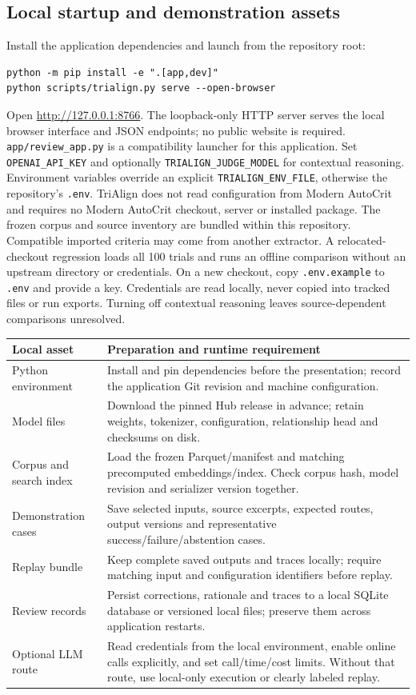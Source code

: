 \documentclass[10pt,letterpaper]{article}
\newcommand{\pathcode}[1]{\nolinkurl{#1}}
\begin{document}
\subsection{Local startup and demonstration assets}
\label{sec:localdemo}
Install the application dependencies and launch from the repository root:
\begin{verbatim}
python -m pip install -e ".[app,dev]"
python scripts/trialign.py serve --open-browser
\end{verbatim}
Open \url{http://127.0.0.1:8766}. The loopback-only HTTP server serves the
local browser interface and JSON endpoints; no public website is required.
\pathcode{app/review_app.py} is a compatibility launcher for this application.
Set \pathcode{OPENAI_API_KEY} and optionally \pathcode{TRIALIGN_JUDGE_MODEL}
for contextual reasoning. Environment variables override an explicit
\pathcode{TRIALIGN_ENV_FILE}, otherwise the repository's \pathcode{.env}.
TriAlign does not read configuration from Modern AutoCrit and requires no
Modern AutoCrit checkout, server or installed package. The frozen corpus and
source inventory are bundled within this repository. Compatible imported
criteria may come from another extractor. A relocated-checkout regression
loads all 100 trials and runs an offline comparison without an upstream
directory or credentials. On a new checkout,
copy \pathcode{.env.example} to \pathcode{.env} and provide a key.
Credentials are read locally, never copied into tracked files or run exports.
Turning off contextual reasoning leaves source-dependent comparisons unresolved.

\begin{longtable}{L{.25\linewidth}L{.66\linewidth}}
\toprule Local asset & Preparation and runtime requirement\\\midrule
\endhead
Python environment & Install and pin dependencies before the presentation; record the application Git revision and machine configuration.\\
Model files & Download the pinned Hub release in advance; retain weights, tokenizer, configuration, relationship head and checksums on disk.\\
Corpus and search index & Load the frozen Parquet/manifest and matching precomputed embeddings/index. Check corpus hash, model revision and serializer version together.\\
Demonstration cases & Save selected inputs, source excerpts, expected routes, output versions and representative success/failure/abstention cases.\\
Replay bundle & Keep complete saved outputs and traces locally; require matching input and configuration identifiers before replay.\\
Review records & Persist corrections, rationale and traces to a local SQLite database or versioned local files; preserve them across application restarts.\\
Optional LLM route & Read credentials from the local environment, enable online calls explicitly, and set call/time/cost limits. Without that route, use local-only execution or clearly labeled replay.\\\bottomrule
\end{longtable}
\end{document}
